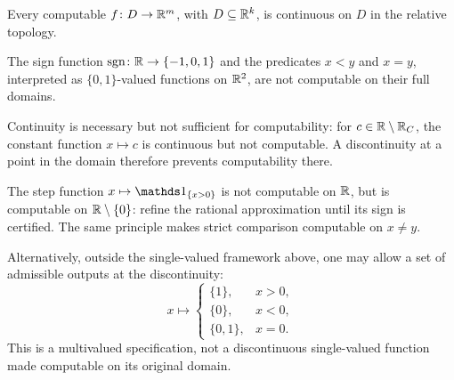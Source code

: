 \begin{theorem}
Every computable $f\colon D\to\mathbb{R}^m$, with $D\subseteq\mathbb{R}^k$,
is continuous on $D$ in the relative topology.
\end{theorem}

\begin{corollary}
The sign function $\operatorname{sgn}\colon\mathbb{R}\to\{-1, 0, 1\}$
and the predicates $x<y$ and $x=y$, interpreted as
$\{0, 1\}$-valued functions on $\mathbb{R}^2$, are not computable
on their full domains.
\end{corollary}

\begin{remark}
Continuity is necessary but not sufficient for computability:
for $c\in\mathbb{R}\setminus\mathbb{R}_C$, the constant function $x\mapsto c$
is continuous but not computable. A discontinuity at a point
in the domain therefore prevents computability there.
\end{remark}

\begin{example}
The step function $x\mapsto\indicator{\{x>0\}}$ is not computable on
$\mathbb{R}$, but is computable on $\mathbb{R}\setminus\{0\}$: refine the
rational approximation until its sign is certified. The same
principle makes strict comparison computable on $x\ne y$.

Alternatively, outside the single-valued framework above, one may
allow a set of admissible outputs at the discontinuity:
\[
 x\longmapsto
 \begin{cases}
  \{1\}, &x>0, \\
  \{0\}, &x<0, \\
  \{0, 1\}, &x=0.
 \end{cases}
\]
This is a multivalued specification, not a discontinuous
single-valued function made computable on its original domain.
\end{example}

